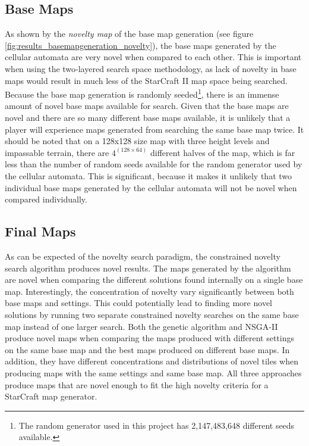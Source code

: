 \subsection{Base Maps}
\label{discussion_novelty_basemaps}
As shown by the \textit{novelty map} of the base map generation (see figure \ref{fig:results_basemapgeneration_novelty}), the base maps generated by the cellular automata are very novel when compared to each other. This is important when using the two-layered search space methodology, as lack of novelty in base maps would result in much less of the StarCraft II map space being searched. Because the base map generation is randomly seeded\footnote{The random generator used in this project has 2,147,483,648 different seeds available.}, there is an immense amount of novel base maps available for search. Given that the base maps are novel and there are so many different base maps available, it is unlikely that a player will experience maps generated from searching the same base map twice. It should be noted that on a 128x128 size map with three height levels and impassable terrain, there are $4^{(128\times 64)}$ different halves of the map, which is far less than the number of random seeds available for the random generator used by the cellular automata. This is significant, because it makes it unlikely that two individual base maps generated by the cellular automata will not be novel when compared individually.

\subsection{Final Maps}
\label{discussion_novelty_finalmaps}
As can be expected of the novelty search paradigm, the constrained novelty search algorithm produces novel results. The maps generated by the algorithm are novel when comparing the different solutions found internally on a single base map. Interestingly, the concentration of novelty vary significantly between both base maps and settings. This could potentially lead to finding more novel solutions by running two separate constrained novelty searches on the same base map instead of one larger search. Both the genetic algorithm and NSGA-II produce novel maps when comparing the maps produced with different settings on the same base map and the best maps produced on different base maps. In addition, they have different concentrations and distributions of novel tiles when producing maps with the same settings and same base map. All three approaches produce maps that are novel enough to fit the high novelty criteria for a StarCraft map generator.

